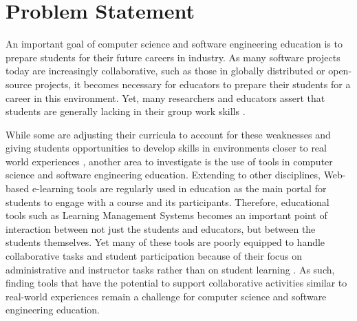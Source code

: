 \section{Problem Statement}
An important goal of computer science and software engineering education is to prepare students for their future careers in industry. As many software projects today are increasingly collaborative, such as those in globally distributed or open-source projects, it becomes necessary for educators to prepare their students for a career in this environment. Yet, many researchers and educators assert that students are generally lacking in their group work skills \cite{waite2004student}.

While some are adjusting their curricula to account for these weaknesses \cite{jazayeri2004education} and giving students opportunities to develop skills in environments closer to real world experiences \cite{coleman2012collaboration}, another area to investigate is the use of tools in computer science and software engineering education. Extending to other disciplines, Web-based e-learning tools are regularly used in education as the main portal for students to engage with a course and its participants. Therefore, educational tools such as Learning Management Systems becomes an important point of interaction between not just the students and educators, but between the students themselves. Yet many of these tools are poorly equipped to handle collaborative tasks and student participation because of their focus on administrative and instructor tasks rather than on student learning \cite{mcloughlin2007social}. As such, finding tools that have the potential to support collaborative activities similar to real-world experiences remain a challenge for computer science and software engineering education.



